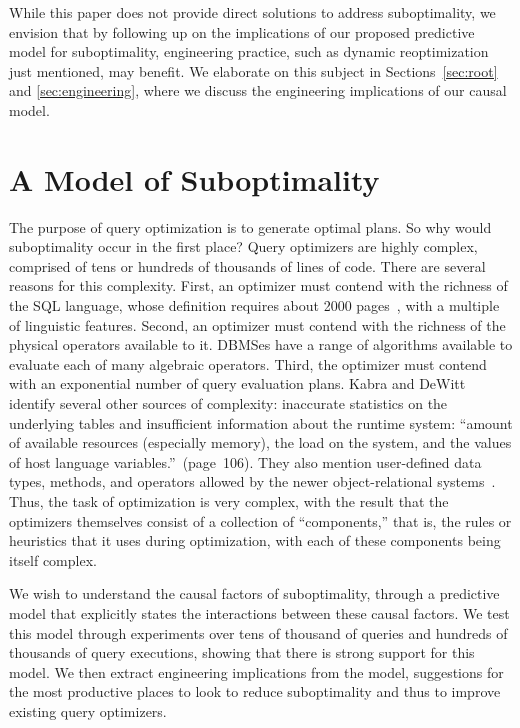 \documentclass[prodmode,acmtods]{acmsmall}
\begin{document}
While this paper does not provide direct solutions to address
suboptimality, we envision that by following up on the implications of our proposed predictive model
for suboptimality, engineering practice, such as dynamic reoptimization just
mentioned, may benefit. We elaborate on this subject in
Sections~\ref{sec:root} and \ref{sec:engineering}, where we discuss the engineering implications
of our causal model.

\section{A Model of Suboptimality}\label{sec:model}

The purpose of query optimization is to generate optimal plans.  So
why would suboptimality occur in the first place? Query optimizers are
highly complex, comprised of tens or hundreds of thousands of lines of code. There
are several reasons for this complexity. First, an optimizer must
contend with the richness of the SQL language, whose definition
requires about 2000 pages~\cite{SQL2008}, with a multiple of
linguistic features. Second, an optimizer must contend with the
\hbox{richness} of the physical operators available to it. \hbox{DBMSes} have a
range of algorithms available to evaluate each of many algebraic
operators. Third, the optimizer must contend with an exponential
number of query evaluation plans. Kabra and DeWitt~\cite{kabra98}
identify several other sources of complexity: inaccurate statistics on
the underlying tables and insufficient information about the runtime
system: ``amount of available resources (especially memory), the load
on the system, and the values of host language
variables.''~(page~106). They also mention user-defined data types,
methods, and operators allowed by the newer object-relational
systems~\cite{Melton03}. Thus, the task of optimization is very
complex, with the result that the optimizers themselves consist of a
collection of ``components,'' that is, the rules or heuristics that it
uses during optimization, with each of these components being itself
complex.

We wish to understand the causal factors of suboptimality, through a
predictive model that explicitly states the interactions between these
causal factors. We test this model through experiments over tens of thousand
of queries and hundreds of thousands of query executions, showing that there
is strong support for this model. We then extract engineering implications
from the model, suggestions for the most productive places to look to reduce
suboptimality and thus to improve existing query optimizers.
\end{document}
